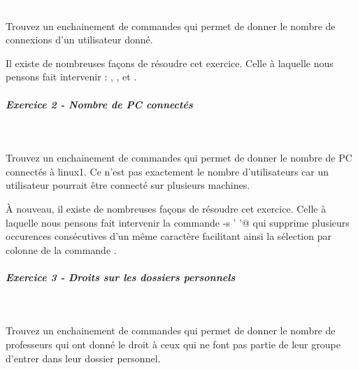 \documentclass[11pt,a4paper]{article}
\begin{document}
					\textcolor{white}{.} \par
				
            \par
        
					Trouvez un enchainement de commandes
					qui permet de donner le nombre de connexions
					d'un utilisateur donn\'e.
				
            \par
        
					Il existe de nombreuses fa\c cons de r\'esoudre
					cet exercice. 
					Celle \`a laquelle nous pensons fait intervenir :
					\verb@grep@,
					\verb@wc@,
					et \verb@who@.
				
            \par
        
			
		\subparagraph{Exercice 2 - Nombre de PC connect\'es} 
		
					\textcolor{white}{.} \par
				
            \par
        
					Trouvez un enchainement de commandes
					qui permet de donner le nombre de PC
					connect\'es \`a linux1.
					Ce n'est pas exactement le nombre d'utilisateurs
					car un utilisateur pourrait \^etre connect\'e
					sur plusieurs machines.
				
            \par
        
					\`A nouveau,
					il existe de nombreuses fa\c cons de r\'esoudre
					cet exercice. 
					Celle \`a laquelle nous pensons fait intervenir
					la commande 
					\verb@tr -s ' '@
					qui supprime plusieurs occurences
					cons\'ecutives d'un m\^eme caract\`ere
					facilitant ainsi la s\'election par colonne
					de la commande 
					\verb@cut@.
				
            \par
        
			
		\subparagraph{Exercice 3 - Droits sur les dossiers personnels} 
		
					\textcolor{white}{.} \par
				
            \par
        
					Trouvez un enchainement de commandes
					qui permet de donner 
					le nombre de professeurs
					qui ont donn\'e le droit \`a ceux qui
					ne font pas partie de leur groupe
					d'entrer dans leur dossier personnel.
				
\end{document}
